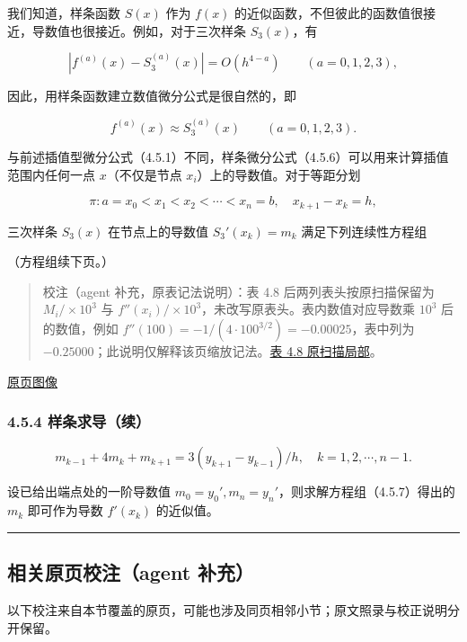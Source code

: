 \documentclass[
  10pt,
  fontset=fandol]{ctexart}
\begin{document}
我们知道，样条函数 \(S(x)\) 作为 \(f(x)\) 的近似函数，不但彼此的函数值很接近，导数值也很接近。例如，对于三次样条 \(S_3(x)\)，有

\[
|f^{(a)}(x)-S_3^{(a)}(x)|=O(h^{4-a})\qquad(a=0,1,2,3),
\]

因此，用样条函数建立数值微分公式是很自然的，即

\[
f^{(a)}(x)\approx S_3^{(a)}(x)\qquad(a=0,1,2,3).
\tag{4.5.6}
\]

与前述插值型微分公式（4.5.1）不同，样条微分公式（4.5.6）可以用来计算插值范围内任何一点 \(x\)（不仅是节点 \(x_i\)）上的导数值。对于等距分划

\[
\pi:a=x_0<x_1<x_2<\cdots<x_n=b,\quad x_{k+1}-x_k=h,
\]

三次样条 \(S_3(x)\) 在节点上的导数值 \(S_3'(x_k)=m_k\) 满足下列连续性方程组

（方程组续下页。）

\begin{quote}
校注（agent 补充，原表记法说明）：表 4.8 后两列表头按原扫描保留为 \(M_i/\times10^3\) 与 \(f''(x_i)/\times10^3\)，未改写原表头。表内数值对应导数乘 \(10^3\) 后的数值，例如 \(f''(100)=-1/(4\cdot100^{3/2})=-0.00025\)，表中列为 \(-0.25000\)；此说明仅解释该页缩放记法。\href{../assets/ch04b/review-table-4-8.png}{表 4.8 原扫描局部}。
\end{quote}

\href{../../source-images/pdf-117.jpeg}{原页图像}

\subsubsection{4.5.4 样条求导（续）}\label{ux6837ux6761ux6c42ux5bfcux7eed}

\[
m_{k-1}+4m_k+m_{k+1}=3(y_{k+1}-y_{k-1})/h,\quad k=1,2,\cdots,n-1.
\tag{4.5.7}
\]

设已给出端点处的一阶导数值 \(m_0=y_0',m_n=y_n'\)，则求解方程组（4.5.7）得出的 \(m_k\) 即可作为导数 \(f'(x_k)\) 的近似值。

\begin{center}\rule{0.5\linewidth}{0.5pt}\end{center}

\subsection{相关原页校注（agent 补充）}\label{ux76f8ux5173ux539fux9875ux6821ux6ce8agent-ux8865ux5145}

以下校注来自本节覆盖的原页，可能也涉及同页相邻小节；原文照录与校正说明分开保留。
\end{document}
